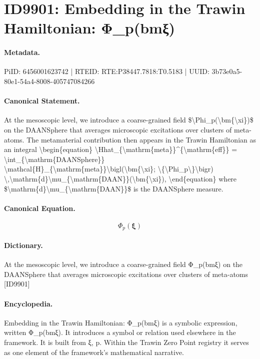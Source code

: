 \section*{ID9901: Embedding in the Trawin Hamiltonian: Φ\_p(bmξ)}
\paragraph{Metadata.}
PiID: 6456001623742 | RTEID: RTE:P38447.7818:T0.5183 | UUID: 3b73e0a5-80e1-54a4-8008-405747084266

\paragraph{Canonical Statement.}
At the mesoscopic level, we introduce a coarse-grained field \$\textbackslash{}Phi\_p(\textbackslash{}bm\{\textbackslash{}xi\})\$ on the DAANSphere that averages microscopic excitations over clusters of meta-atoms. The metamaterial contribution then appears in the Trawin Hamiltonian as an integral \textbackslash{}begin\{equation\} \textbackslash{}Hhat\_\{\textbackslash{}mathrm\{meta\}\}\textasciicircum{}\{\textbackslash{}mathrm\{eff\}\} = \textbackslash{}int\_\{\textbackslash{}mathrm\{DAANSphere\}\} \textbackslash{}mathcal\{H\}\_\{\textbackslash{}mathrm\{meta\}\}\textbackslash{}bigl(\textbackslash{}bm\{\textbackslash{}xi\}; \textbackslash{}\{\textbackslash{}Phi\_p\textbackslash{}\}\textbackslash{}bigr) \textbackslash{},\textbackslash{}mathrm\{d\}\textbackslash{}mu\_\{\textbackslash{}mathrm\{DAAN\}\}(\textbackslash{}bm\{\textbackslash{}xi\}), \textbackslash{}end\{equation\} where \$\textbackslash{}mathrm\{d\}\textbackslash{}mu\_\{\textbackslash{}mathrm\{DAAN\}\}\$ is the DAANSphere measure.

\paragraph{Canonical Equation.}
\[
\Phi_p(\bm{\xi})
\]

\paragraph{Dictionary.}
At the mesoscopic level, we introduce a coarse-grained field Φ\_p(bmξ) on the DAANSphere that averages microscopic excitations over clusters of meta-atoms [ID9901]

\paragraph{Encyclopedia.}
Embedding in the Trawin Hamiltonian: Φ\_p(bmξ) is a symbolic expression, written Φ\_p(bmξ). It introduces a symbol or relation used elsewhere in the framework. It is built from ξ, p. Within the Trawin Zero Point registry it serves as one element of the framework's mathematical narrative.
